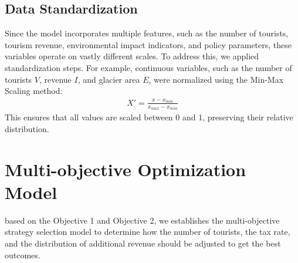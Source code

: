 \documentclass[UTF8]{mcmthesis}
\begin{document}
        \subsection{Data Standardization}
        \hspace*{2em}Since the model incorporates multiple features, such as the number of tourists, tourism revenue, environmental impact indicators, and policy parameters, these variables operate on vastly different scales. To address this, we applied standardization steps. For example, continuous variables, such as the number of tourists {$V$}, revenue {$I$}, and glacier area {$E$}, were normalized using the Min-Max Scaling method:
        \begin{equation}
        \begin{aligned}
            {X}' = \frac{x-x_{min}}{x_{max}-x_{min}} 
        \end{aligned}
        \end{equation}
        \hspace*{2em} This ensures that all values are scaled between 0 and 1, preserving their relative distribution.


    \section{Multi-objective Optimization Model}
    \hspace*{2em}based on the Objective 1 and Objective 2, we establishes the multi-objective strategy selection model to determine how the number of tourists, the tax rate, and the distribution of additional revenue should be adjusted to get the best outcomes.
\end{document}
